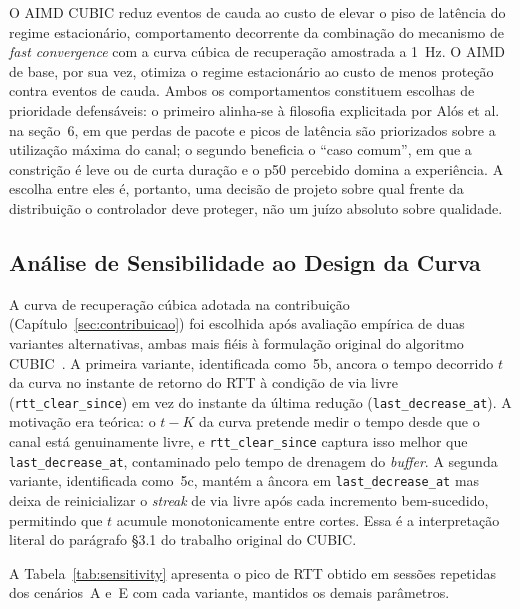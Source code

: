 O AIMD CUBIC reduz eventos de cauda ao custo de elevar o piso
de latência do regime estacionário, comportamento decorrente
da combinação do mecanismo de \emph{fast convergence} com a
curva cúbica de recuperação amostrada a 1~Hz. O AIMD de base,
por sua vez, otimiza o regime estacionário ao custo de menos
proteção contra eventos de cauda. Ambos os comportamentos
constituem escolhas de prioridade defensáveis: o primeiro
alinha-se à filosofia explicitada por Alós et al.~\cite{alos2019}
na seção~6, em que perdas de pacote e picos de latência são
priorizados sobre a utilização máxima do canal; o segundo
beneficia o ``caso comum'', em que a constrição é leve ou de
curta duração e o p50 percebido domina a experiência. A
escolha entre eles é, portanto, uma decisão de projeto sobre
qual frente da distribuição o controlador deve proteger,
não um juízo absoluto sobre qualidade.

\subsection{Análise de Sensibilidade ao Design da Curva}\label{sec:sensibilidade}

A curva de recuperação cúbica adotada na contribuição
(Capítulo~\ref{sec:contribuicao}) foi escolhida após avaliação
empírica de duas variantes alternativas, ambas mais fiéis à
formulação original do algoritmo CUBIC~\cite{cubic}. A primeira
variante, identificada como~5b, ancora o tempo decorrido $t$ da
curva no instante de retorno do RTT à condição de via livre
(\texttt{rtt\_clear\_since}) em vez do instante da última redução
(\texttt{last\_decrease\_at}). A motivação era teórica: o $t-K$
da curva pretende medir o tempo desde que o canal está
genuinamente livre, e \texttt{rtt\_clear\_since} captura isso
melhor que \texttt{last\_decrease\_at}, contaminado pelo
tempo de drenagem do \emph{buffer}. A segunda variante,
identificada como~5c, mantém a âncora em
\texttt{last\_decrease\_at} mas deixa de reinicializar o
\emph{streak} de via livre após cada incremento bem-sucedido,
permitindo que $t$ acumule monotonicamente entre cortes. Essa
é a interpretação literal do parágrafo §3.1 do trabalho
original do CUBIC.

A Tabela~\ref{tab:sensitivity} apresenta o pico de RTT obtido
em sessões repetidas dos cenários~A e~E com cada variante,
mantidos os demais parâmetros.

